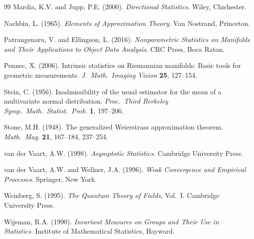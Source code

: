 \documentclass[11pt]{article}
\begin{document}
\begin{thebibliography}{99}
Mardia, K.V. and Jupp, P.E. (2000).
\textit{Directional Statistics}.
Wiley, Chichester.

Nachbin, L. (1965).
\textit{Elements of Approximation Theory}.
Van Nostrand, Princeton.

Patrangenaru, V. and Ellingson, L. (2016).
\textit{Nonparametric Statistics on Manifolds and Their Applications to Object Data Analysis}.
CRC Press, Boca Raton.

Pennec, X. (2006).
Intrinsic statistics on Riemannian manifolds: Basic tools for geometric measurements.
\textit{J.\ Math.\ Imaging Vision} \textbf{25}, 127--154.

Stein, C. (1956).
Inadmissibility of the usual estimator for the mean of a multivariate normal distribution.
\textit{Proc.\ Third Berkeley Symp.\ Math.\ Statist.\ Prob.} \textbf{1}, 197--206.

Stone, M.H. (1948).
The generalized Weierstrass approximation theorem.
\textit{Math.\ Mag.} \textbf{21}, 167--184, 237--254.

van der Vaart, A.W. (1998).
\textit{Asymptotic Statistics}.
Cambridge University Press.

van der Vaart, A.W. and Wellner, J.A. (1996).
\textit{Weak Convergence and Empirical Processes}.
Springer, New York.

Weinberg, S. (1995).
\textit{The Quantum Theory of Fields}, Vol.~I.
Cambridge University Press.

Wijsman, R.A. (1990).
\textit{Invariant Measures on Groups and Their Use in Statistics}.
Institute of Mathematical Statistics, Hayward.

\end{thebibliography}
\end{document}
